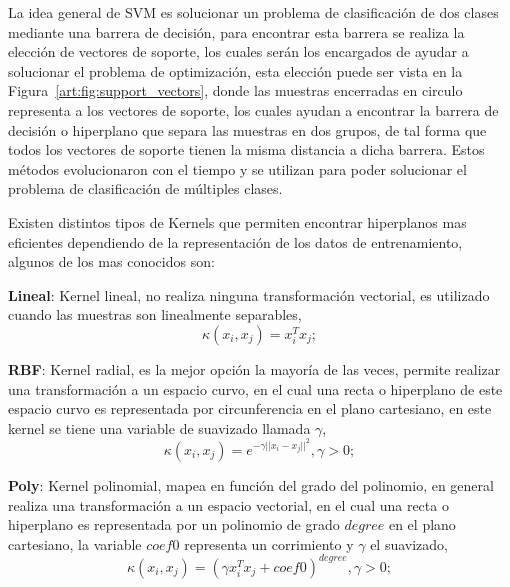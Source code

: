 	La idea general de SVM es solucionar un problema de clasificación de dos clases mediante una barrera de decisión, para encontrar esta barrera se realiza la elección de vectores de soporte, los cuales serán los encargados de ayudar a solucionar el problema de optimización, esta elección puede ser vista en la Figura~\ref{art:fig:support_vectors}, donde las muestras encerradas en circulo representa a los vectores de soporte, los cuales ayudan a encontrar la barrera de decisión o hiperplano que separa las muestras en dos grupos, de tal forma que todos los vectores de soporte tienen la misma distancia a dicha barrera. Estos métodos evolucionaron con el tiempo y se utilizan para poder solucionar el problema de clasificación de múltiples clases.

	Existen distintos tipos de Kernels que permiten encontrar hiperplanos mas eficientes dependiendo de la representación de los datos de entrenamiento, algunos de los mas conocidos son:
	
	\textbf{Lineal}: Kernel lineal, no realiza ninguna transformación vectorial, es utilizado cuando las muestras son linealmente separables,
	\begin{equation}
	\kappa(x_i,x_j) = x_{i}^{T}x_j;
	\label{k:lineal}
	\end{equation}
	
	\textbf{RBF}: Kernel radial, es la mejor opción la mayoría de las veces, permite realizar una transformación a un espacio curvo, en el cual una recta o hiperplano de este espacio curvo es representada por circunferencia en el plano cartesiano, en este kernel se tiene una variable de suavizado llamada $\gamma$,
	\begin{equation}
	\kappa(x_i,x_j) = e^{-\gamma||x_i - x_j||^2 }, \gamma > 0;
	\label{k:RBF}
	\end{equation}
	
	\textbf{Poly}: Kernel polinomial, mapea en función del grado del polinomio, en general realiza una transformación a un espacio vectorial, en el cual una recta o hiperplano es representada por un polinomio de grado $degree$ en el plano cartesiano, la variable $coef0$ representa un corrimiento y $\gamma$ el suavizado,
	\begin{equation}
	\kappa(x_i,x_j) = (\gamma x_{i}^{T}x_j + coef0)^{degree}, \gamma > 0;
	\label{k:Poly}
	\end{equation}
	
	
